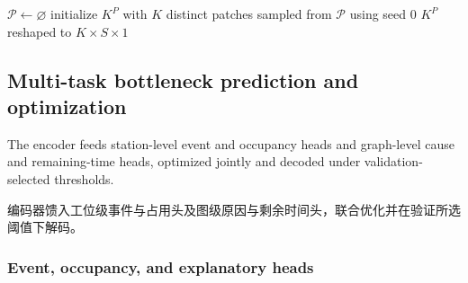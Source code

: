 \documentclass[a4paper,fleqn]{cas-dc}
\newcommand{\zhpara}[1]{%
  \par\begingroup\small\color{black!72}\noindent #1\par\endgroup}
\begin{document}
\begin{algorithm}[t]
\caption{Training-only temporal pattern clustering.}
\label{alg:pattern-bank}
$\mathcal{P}\leftarrow\varnothing$\;
initialize $K^P$ with $K$ distinct patches sampled from $\mathcal{P}$ using seed $0$\;
\Return $K^P$ reshaped to $K\times S\times1$\;
\end{algorithm}

\subsection{Multi-task bottleneck prediction and optimization}

The encoder feeds station-level event and occupancy heads and graph-level cause and remaining-time heads, optimized jointly and decoded under validation-selected thresholds.

\zhpara{编码器馈入工位级事件与占用头及图级原因与剩余时间头，联合优化并在验证所选阈值下解码。}


\subsubsection{Event, occupancy, and explanatory heads}
\end{document}
